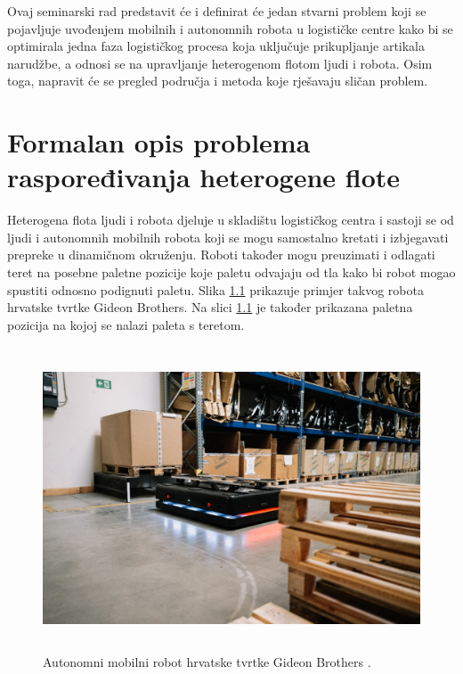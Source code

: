 \documentclass[times, utf8, seminar]{fer}
\begin{document}
\pagebreak

Ovaj seminarski rad predstavit će i definirat će jedan stvarni problem koji
se pojavljuje uvođenjem mobilnih i autonomnih robota u logističke centre kako bi se
optimirala jedna faza logističkog procesa koja uključuje prikupljanje
artikala narudžbe, a odnosi se na upravljanje heterogenom flotom ljudi i robota.
Osim toga, napravit će se pregled područja i
metoda koje rješavaju sličan problem.

\chapter{Formalan opis problema raspoređivanja heterogene flote}
\label{chap:opis}
Heterogena flota ljudi i robota djeluje u skladištu logističkog centra i sastoji
se od ljudi i autonomnih mobilnih robota  koji se
mogu samostalno kretati i izbjegavati prepreke u dinamičnom okruženju. Roboti
također mogu preuzimati i odlagati teret na posebne paletne pozicije koje
paletu odvajaju od tla kako bi robot mogao spustiti odnosno podignuti paletu.
Slika \ref{fig:robot-01} prikazuje primjer takvog robota hrvatske tvrtke Gideon Brothers.
Na slici \ref{fig:robot-01} je također prikazana paletna pozicija na kojoj se nalazi
paleta s teretom.

\begin{figure}[htb]
    \centering
    \includegraphics[height=9cm]{images/robot-01.jpg}
    \caption{Autonomni mobilni robot hrvatske tvrtke Gideon Brothers \citep{Gideon:Logisticsrobotlingo}.}
    \label{fig:robot-01}
\end{figure}

\pagebreak
\end{document}
